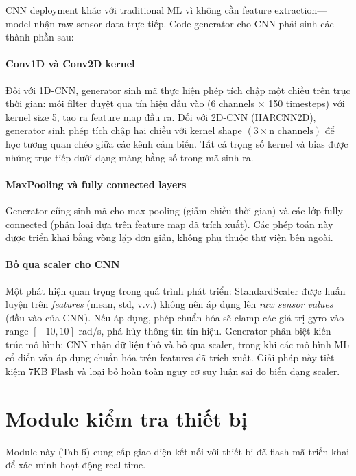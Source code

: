 CNN deployment khác với traditional ML vì không cần feature extraction---model nhận raw sensor data trực tiếp. Code generator cho CNN phải sinh các thành phần sau:

\paragraph{Conv1D và Conv2D kernel}
Đối với 1D-CNN, generator sinh mã thực hiện phép tích chập một chiều trên trục thời gian: mỗi filter duyệt qua tín hiệu đầu vào (6 channels $\times$ 150 timesteps) với kernel size 5, tạo ra feature map đầu ra. Đối với 2D-CNN (HARCNN2D), generator sinh phép tích chập hai chiều với kernel shape $(3 \times \text{n\_channels})$ để học tương quan chéo giữa các kênh cảm biến. Tất cả trọng số kernel và bias được nhúng trực tiếp dưới dạng mảng hằng số trong mã sinh ra.

\paragraph{MaxPooling và fully connected layers}
Generator cũng sinh mã cho max pooling (giảm chiều thời gian) và các lớp fully connected (phân loại dựa trên feature map đã trích xuất). Các phép toán này được triển khai bằng vòng lặp đơn giản, không phụ thuộc thư viện bên ngoài.

\paragraph{Bỏ qua scaler cho CNN}
Một phát hiện quan trọng trong quá trình phát triển: StandardScaler được huấn luyện trên \textit{features} (mean, std, v.v.) không nên áp dụng lên \textit{raw sensor values} (đầu vào của CNN). Nếu áp dụng, phép chuẩn hóa sẽ clamp các giá trị gyro vào range $[-10, 10]$ rad/s, phá hủy thông tin tín hiệu. Generator phân biệt kiến trúc mô hình: CNN nhận dữ liệu thô và bỏ qua scaler, trong khi các mô hình ML cổ điển vẫn áp dụng chuẩn hóa trên features đã trích xuất. Giải pháp này tiết kiệm 7KB Flash và loại bỏ hoàn toàn nguy cơ suy luận sai do biến dạng scaler.

\section{Module kiểm tra thiết bị}
\label{sec:device_testing_module}

Module này (Tab 6) cung cấp giao diện kết nối với thiết bị đã flash mã triển khai để xác minh hoạt động real-time.

